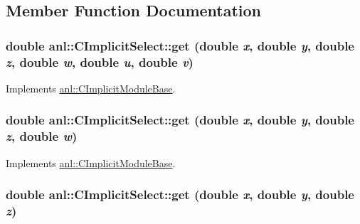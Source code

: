 \subsection{Member Function Documentation}
\hypertarget{classanl_1_1CImplicitSelect_ab66ac3d292721897bb15009585dc4190}{
\subsubsection[{get}]{\setlength{\rightskip}{0pt plus 5cm}double anl::CImplicitSelect::get (double {\em x}, \/  double {\em y}, \/  double {\em z}, \/  double {\em w}, \/  double {\em u}, \/  double {\em v})}}
\label{classanl_1_1CImplicitSelect_ab66ac3d292721897bb15009585dc4190}


Implements \hyperlink{classanl_1_1CImplicitModuleBase_aa40b7d54572197612a4fea44b63447eb}{anl::CImplicitModuleBase}.\hypertarget{classanl_1_1CImplicitSelect_ac0b010e48784974a4c7d9639a9a6f84e}{
\subsubsection[{get}]{\setlength{\rightskip}{0pt plus 5cm}double anl::CImplicitSelect::get (double {\em x}, \/  double {\em y}, \/  double {\em z}, \/  double {\em w})}}
\label{classanl_1_1CImplicitSelect_ac0b010e48784974a4c7d9639a9a6f84e}


Implements \hyperlink{classanl_1_1CImplicitModuleBase_a3cf520bdab59631864253c03b4e1723f}{anl::CImplicitModuleBase}.\hypertarget{classanl_1_1CImplicitSelect_a324bded1a066192e2831cd7d80063cbc}{
\subsubsection[{get}]{\setlength{\rightskip}{0pt plus 5cm}double anl::CImplicitSelect::get (double {\em x}, \/  double {\em y}, \/  double {\em z})}}
\label{classanl_1_1CImplicitSelect_a324bded1a066192e2831cd7d80063cbc}


